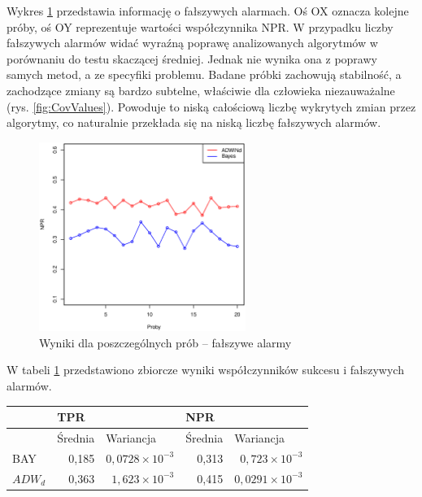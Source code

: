 Wykres \ref{fig:CovValuesResNpr} przedstawia informację o fałszywych alarmach.
Oś OX oznacza kolejne próby,
oś OY reprezentuje wartości współczynnika NPR.
W przypadku liczby fałszywych alarmów widać wyraźną poprawę analizowanych algorytmów w porównaniu do testu skaczącej średniej.
Jednak nie wynika ona z poprawy samych metod,
a ze specyfiki problemu.
Badane próbki zachowują stabilność,
a zachodzące zmiany są bardzo subtelne,
właściwie dla człowieka niezauważalne (rys. \ref{fig:CovValues}).
Powoduje to niską całościową liczbę wykrytych zmian przez algorytmy,
co naturalnie przekłada się na niską liczbę fałszywych alarmów.
\begin{figure}[htbp]
  \centering
  \includegraphics[width=0.6\textwidth]{img/ch-5-cov-res-npr}
  \caption{Wyniki dla poszczególnych prób -- fałszywe alarmy}
  \label{fig:CovValuesResNpr}
\end{figure}

W tabeli \ref{tab:CovResult} przedstawiono zbiorcze wyniki współczynników sukcesu i fałszywych alarmów.
\begin{table}[h]
  \label{tab:CovResult}
  \centering
  \begin{tabular}{l r r r r}
    & \multicolumn{2}{l}{TPR} & \multicolumn{2}{l}{NPR} \\
    \hline
    & \multicolumn{1}{l}{Średnia} & \multicolumn{1}{l}{Wariancja}& \multicolumn{1}{l}{Średnia} & \multicolumn{1}{l}{Wariancja} \\
    \hline
    BAY & 0,185 & $0,0728 \times 10^{-3}$ & 0,313 & $0,723 \times 10^{-3}$ \\
    $ADW_{d}$ & 0,363 & $1,623 \times 10^{-3}$ & 0,415 & $0,0291 \times 10^{-3}$ \\
  \end{tabular}
\end{table}

